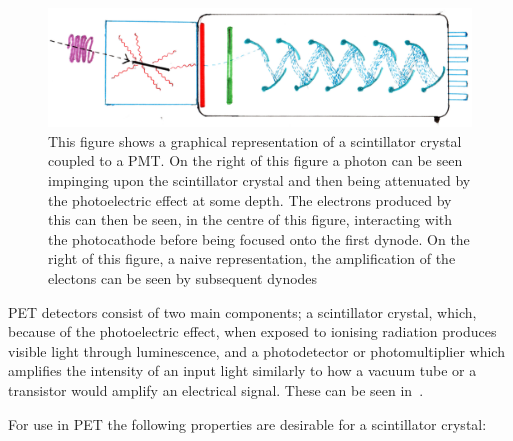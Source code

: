                 \begin{figure}
                    \centering
                    
                    \includegraphics[width=1.0\linewidth]{figures/background_photomultiplier.png}
                    
                    \captionsetup{singlelinecheck=false, justification=raggedright}
                    \caption{This figure shows a graphical representation of a scintillator crystal coupled to a \gls{PMT}. On the right of this figure a photon can be seen impinging upon the scintillator crystal and then being attenuated by the photoelectric effect at some depth. The electrons produced by this can then be seen, in the centre of this figure, interacting with the photocathode before being focused onto the first dynode. On the right of this figure, a naive representation, the amplification of the electons can be seen by subsequent dynodes} \label{fig:photon_detection_photomultiplier}
                \end{figure}
                
                PET detectors consist of two main components; a scintillator crystal, which, because of the photoelectric effect, when exposed to ionising radiation produces visible light through luminescence, and a photodetector or photomultiplier which amplifies the intensity of an input light similarly to how a vacuum tube or a transistor would amplify an electrical signal. These can be seen in~.
                
                For use in \gls{PET} the following properties are desirable for a scintillator crystal:
                
